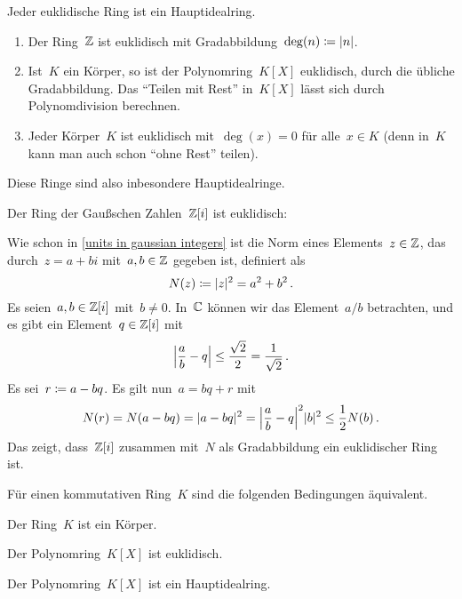 \begin{proposition}
  Jeder euklidische Ring ist ein Hauptidealring.
\end{proposition}

\begin{example}
  \leavevmode
  \begin{enumerate}
    \item
      Der Ring~$\Integer$ ist euklidisch mit Gradabbildung~$\deg(n) \defined \abs{n}$.
    \item
      Ist~$K$ ein Körper, so ist der Polynomring~$K[X]$ euklidisch, durch die übliche Gradabbildung.
      Das \enquote{Teilen mit Rest} in~$K[X]$ lässt sich durch Polynomdivision berechnen.
    \item
      Jeder Körper~$K$ ist euklidisch mit~$\deg(x) = 0$ für alle~$x \in K$ (denn in~$K$ kann man auch schon \enquote{ohne Rest} teilen).
  \end{enumerate}
  Diese Ringe sind also inbesondere Hauptidealringe.
\end{example}

\begin{example}
  Der Ring der Gaußschen Zahlen~$\Integer[i]$ ist euklidisch:

  Wie schon in \cref{units in gaussian integers} ist die Norm eines Elements~$z \in \Integer$, das durch~$z = a + bi$ mit~$a, b \in \Integer$ gegeben ist, definiert als
  \[
    N(z)
    \defined
    \abs{z}^2
    =
    a^2 + b^2 \,.
  \]
  Es seien~$a, b \in \Integer[i]$ mit~$b \neq 0$.
  In~$\Complex$ können wir das Element~$a/b$ betrachten, und es gibt ein Element~$q \in \Integer[i]$ mit
  \[
    \abs*{ \frac{a}{b} - q }
    \leq
    \frac{\sqrt{2}}{2}
    =
    \frac{1}{\sqrt{2}} \,.
  \]
  Es sei~$r \defined a - bq$.
  Es gilt nun~$a = bq + r$ mit
  \[
    N(r)
    =
    N(a - bq)
    =
    \abs{a-bq}^2
    =
    \abs*{ \frac{a}{b} - q }^2 \abs{b}^2
    \leq
    \frac{1}{2} N(b) \,.
  \]
  Das zeigt, dass~$\Integer[i]$ zusammen mit~$N$ als Gradabbildung ein euklidischer Ring ist.
\end{example}

\begin{proposition}
  Für einen kommutativen Ring~$K$ sind die folgenden Bedingungen äquivalent.
  \begin{equivlist}
    \item
      Der Ring~$K$ ist ein Körper.
    \item
      Der Polynomring~$K[X]$ ist euklidisch.
    \item
      Der Polynomring~$K[X]$ ist ein Hauptidealring.
  \end{equivlist}
\end{proposition}

